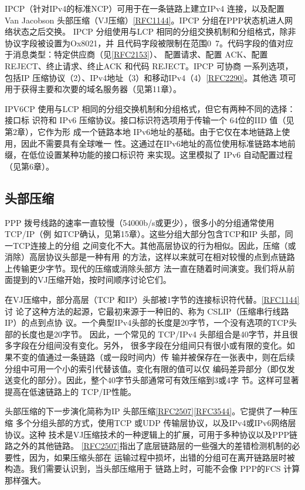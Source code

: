 IPCP（针对IPv4的标准NCP）可用于在一条链路上建立IPv4 连接，以及配置 Van
Jacobson 头部压缩（VJ压缩）\href{https://www.rfc-editor.org/rfc/rfc1144}{[RFC1144]}。IPCP 分组在PPP状态机进人网络状态之后交换。
IPCP 分组使用与LCP 相同的分组交换机制和分组格式，除非协议字段被设置为Ox8021，并
且代码字段被限制在范围0~7。代码字段的值对应于消息类型：特定供应商（见\href{https://www.rfc-editor.org/rfc/rfc2153}{[RFC2153]}）、
配置请求、配置 ACK、配置 REJECT、终止请求、终止ACK 和代码 REJECT。IPCP 可协商
一系列选项，包括IP 压缩协议（2）、IPv4地址（3）和移动IPv4（4）\href{https://www.rfc-editor.org/rfc/rfc2290}{[RFC2290]}。其他选
项可用于获得主要和次要的域名服务器（见第11章）。

IPV6CP 使用与LCP 相同的分组交换机制和分组格式，但它有两种不同的选择：接口标
识符和 IPv6 压缩协议。接口标识符选项用于传输一个 64位的IID 值（见第2章），它作为形
成一个链路本地 IPv6地址的基础。由于它仅在本地链路上使用，因此不需要具有全球唯一
性。这通过在IPv6地址的高位使用标准链路本地前缀，在低位设置某种功能的接口标识符
来实现。这里模拟了 IPv6 自动配置过程（见第6章）。

\subsection{头部压缩}

PPP 拨号线路的速率一直较慢（54000b/s或更少），很多小的分组通常使用TCP/IP（例
如TCP确认，见第15章）。这些分组大部分包含TCP和IP 头部，同一TCP连接上的分组
之间变化不大。其他高层协议的行为相似。因此，压缩（或消除）高层协议头部是一种有用
的方法，这样以来就可在相对较慢的点到点链路上传输更少字节。现代的压缩或消除头部方
法一直在随着时间演变。我们将从前面提到的VJ压缩开始，按时间顺序讨论它们。

在VJ压缩中，部分高层（TCP 和IP）头部被1字节的连接标识符代替。\href{https://www.rfc-editor.org/rfc/rfc1144}{[RFC1144]}讨
论了这种方法的起源，它最初来源于一种旧的、称为 CSLIP（压缩串行线路IP）的点到点协
议。一个典型IPv4头部的长度是20字节，一个没有选项的TCP头部的长度也是20字节。
因此，一个常见的 TCP/IPv4 头部组合是40字节，并且很多字段在分组间没有变化。另外，
很多字段在分组间只有很小或有限的变化。如果不变的值通过一条链路（或一段时间内）传
输并被保存在一张表中，则在后续分组中可用一个小的索引代替该值。变化有限的值可以仅
编码差异部分（即仅发送变化的部分）。因此，整个40字节头部通常可有效压缩到3或4字
节。这样可显著提高在低速链路上的 TCP/IP性能。

头部压缩的下一步演化简称为IP 头部压缩\href{https://www.rfc-editor.org/rfc/rfc2507}{[RFC2507]}\href{https://www.rfc-editor.org/rfc/rfc3544}{[RFC3544]}。它提供了一种压缩
多个分组头部的方式，使用TCP 或UDP 传输层协议，以及IPv4或IPv6网络层协议。这种
技术是VJ压缩技术的一种逻辑上的扩展，可用于多种协议以及PPP链路之外的其他链路。
\href{https://www.rfc-editor.org/rfc/rfc2507}{[RFC2507]}指出了底层链路层的一些强大的差错检测机制的必要性，因为，如果压缩头部在
运输过程中损坏，出错的分组可在离开链路层时被构造。我们需要认识到，当头部压缩用于
链路上时，可能不会像 PPP的FCS 计算那样强大。

